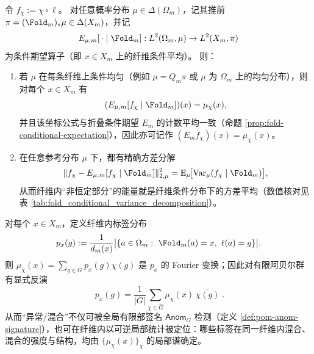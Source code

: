 \begin{proposition}\label{prop:pom-fiber-fourier-variance}
令 \(f_\chi:=\chi\circ \ell\)。
对任意概率分布 \(\mu\in\Delta(\Omega_m)\)，记其推前 \(\pi=(\Fold_m)_*\mu\in\Delta(X_m)\)，并记
\[
E_{\mu,m}[\,\cdot\mid\Fold_m]:L^2(\Omega_m,\mu)\to L^2(X_m,\pi)
\]
为条件期望算子（即 \(x\in X_m\) 上的纤维条件平均）。
则：
\begin{enumerate}
  \item 若 \(\mu\) 在每条纤维上条件均匀（例如 \(\mu=Q_m\pi\) 或 \(\mu\) 为 \(\Omega_m\) 上的均匀分布），则对每个 \(x\in X_m\) 有
  \[
  (E_{\mu,m}[f_\chi\mid\Fold_m])(x)=\mu_\chi(x),
  \]
  并且该坐标公式与折叠条件期望 \(E_m\) 的计数平均一致（命题 \ref{prop:fold-conditional-expectation}），因此亦可记作 \((E_m f_\chi)(x)=\mu_\chi(x)\)。
  \item 在任意参考分布 \(\mu\) 下，都有精确方差分解
  $$
  \|f_\chi-E_{\mu,m}[f_\chi\mid\Fold_m]\|_{2,\mu}^2
  =
  \mathbb{E}_\mu\!\big[\mathrm{Var}_\mu(f_\chi\mid \Fold_m)\big],
  $$
  从而纤维内“非恒定部分”的能量就是纤维条件分布下的方差平均（数值核对见表 \ref{tab:fold_conditional_variance_decomposition}）。
\end{enumerate}
\end{proposition}

\begin{corollary}[纤维内标签分布的可逆重构]\label{cor:pom-fiber-label-distribution-inversion}
对每个 \(x\in X_m\)，定义纤维内标签分布
$$
p_x(g):=\frac{1}{d_m(x)}\bigl|\{a\in\Omega_m:\ \Fold_m(a)=x,\ \ell(a)=g\}\bigr|.
$$
则 \(\mu_\chi(x)=\sum_{g\in G}p_x(g)\chi(g)\) 是 \(p_x\) 的 Fourier 变换；因此对有限阿贝尔群有显式反演
$$
\boxed{\;
p_x(g)=\frac{1}{|G|}\sum_{\chi\in\widehat G}\mu_\chi(x)\,\overline{\chi(g)}\; }.
$$
从而“异常/混合”不仅可被全局有限部签名 \(\mathsf{Anom}_G\) 检测（定义 \ref{def:pom-anom-signature}），也可在纤维内以可逆局部统计被定位：哪些标签在同一纤维内混合、混合的强度与结构，均由 \(\{\mu_\chi(x)\}_{\chi}\) 的局部谱确定。
\end{corollary}

